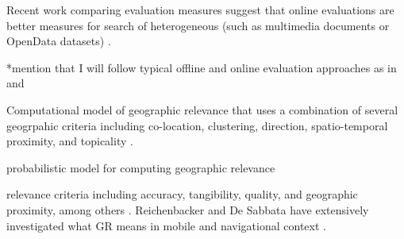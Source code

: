Recent work comparing evaluation measures suggest that online evaluations are better measures for search of heterogeneous (such as multimedia documents or OpenData datasets) \cite{Zhang2018} \cite{Chen2017}.

*mention that I will follow typical offline and online evaluation approaches as in \cite{Zhang2018} and \cite{Chen2017}

Computational model of geographic relevance that uses a combination of several geogrpahic criteria including co-location, clustering, direction, spatio-temporal proximity, and topicality \cite{DeSabbata2014}. 


probabilistic model for computing geographic relevance \cite{DeSabbata2010}
 
 
 \cite{DeSabbata2015} \cite{DeSabbata2012}


relevance criteria including accuracy, tangibility, quality, and geographic proximity, among others \cite{Barry1998}.
Reichenbacker and De Sabbata have extensively investigated what GR means in mobile and navigational context \cite{Reichenbacher2016}.